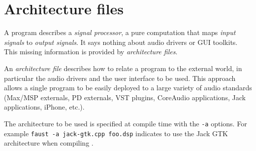\chapter{Architecture files} \label{sec:audio}

A \faust program describes a \emph{signal processor}, a pure computation that maps \emph{input signals} to \emph{output signals}. It says nothing about audio drivers or GUI toolkits. This missing information is provided by \emph{architecture files}. 



An \emph{architecture file} describes how to relate a \faust program to the external world, in particular the audio drivers and the user interface to be used. This approach allows a single \faust program to be easily deployed to a large variety of audio standards (Max/MSP externals, PD externals, VST plugins, CoreAudio applications, Jack applications, iPhone, etc.). 

The architecture to be used is specified at compile time with the \lstinline'-a' options. For example
\lstinline'faust -a jack-gtk.cpp foo.dsp' indicates to use the Jack GTK architecture when compiling .

